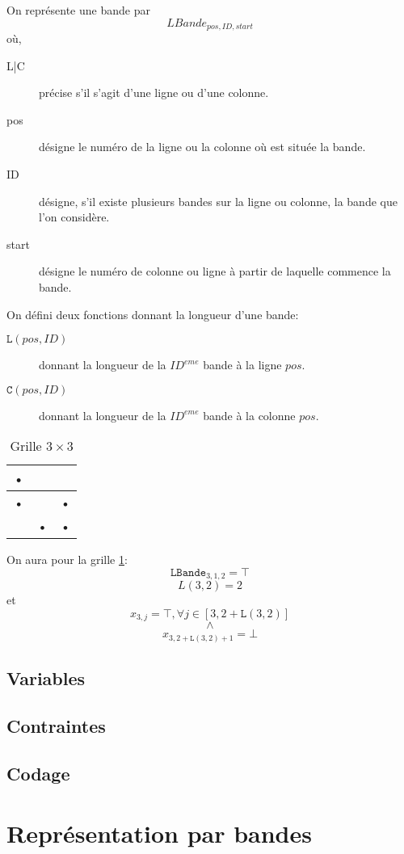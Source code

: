 \documentclass[a4paper,12pt]{report}
\newcommand\black{\cellcolor{black}}
\begin{document}
On représente une bande par $$LBande_{pos,ID,start}$$
où,
\begin{description}
\item[L|C] précise s'il s'agit d'une ligne ou d'une colonne.
\item[pos] désigne le numéro de la ligne ou la colonne où est située la bande.
\item[ID] désigne, s'il existe plusieurs bandes sur la ligne ou colonne, la bande que l'on considère.
\item[start] désigne le numéro de colonne ou ligne à partir de laquelle commence la bande.\\
\end{description}

On défini deux fonctions donnant la longueur d'une bande:
\begin{description}
\item[$\mathtt{L}(pos,ID)$] donnant la longueur de la $ID^{eme}$ bande à la ligne $pos$.
\item[$\mathtt{C}(pos,ID)$] donnant la longueur de la $ID^{eme}$ bande à la colonne $pos$.\\
\end{description} 

\begin{table}[H]
   \centering
	\begin{tabular}{|c|c|c|}
	\hline 
	\black• &  &  \\ 
	\hline 
	\black• &  & \black• \\ 
	\hline 
	 & \black• & \black• \\ 
	\hline 
	\end{tabular}
\caption{\label{Grille3X3} Grille $3\times3$}
\end{table}
On aura pour la grille \ref{Grille3X3}:
$$\mathtt{LBande}_{3,1,2} = \top$$
$$L(3,2) = 2$$
et\\
$$x_{3,j} = \top, \forall j \in [3,2+\mathtt{L}(3,2)]$$
$$\wedge$$
$$x_{3,2+\mathtt{L}(3,2)+1} = \bot  $$
\subsection{Variables}
\subsection{Contraintes}
\subsection{Codage}
\section{Représentation par bandes}
\end{document}
